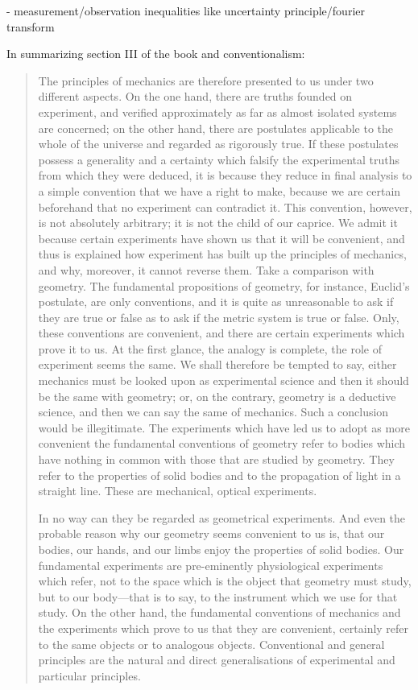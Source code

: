   - measurement/observation inequalities like uncertainty principle/fourier transform
  
  In summarizing section III of the book and conventionalism:
 
 \begin{quote}
     The principles of mechanics are therefore presented to us under two different aspects.  On the one hand, there are truths founded on experiment, and verified approximately as far as almost isolated systems are concerned; on the other hand, there are postulates applicable to the whole of the universe and regarded as rigorously true.  If these postulates possess a generality and a certainty which falsify the experimental truths from which they were deduced, it is because they reduce in final analysis to a simple convention that we have a right to make, because we are certain beforehand that no experiment can contradict it.  This convention, however, is not absolutely arbitrary; it is not the child of our caprice.  We admit it because certain experiments have shown us that it will be convenient, and thus is explained how experiment has built up the principles of mechanics, and why, moreover, it cannot reverse them.  
     Take a comparison with geometry.  The fundamental propositions of geometry, for instance, Euclid's postulate, are only conventions, and it is quite as unreasonable to ask if they are true or false as to ask if the metric system is true or false.  Only, these conventions are convenient, and there are certain experiments which prove it to us.  At the first glance, the analogy is complete, the role of experiment seems the same.  We shall therefore be tempted to say, either mechanics must be looked upon as experimental science and then it should be the same with geometry; or, on the contrary, geometry is a deductive science, and then we can say the same of mechanics.  Such a conclusion would be illegitimate.  The experiments which have led us to adopt as more convenient the fundamental conventions of geometry refer to bodies which have nothing in common with those that are studied by geometry.  They refer to the properties of solid bodies and to the propagation of light in a straight line.  These are mechanical, optical experiments.  
     
     In no way can they be regarded as geometrical experiments.  And even the probable reason why our geometry seems convenient to us is, that our bodies, our hands, and our limbs enjoy the properties of solid bodies.  Our fundamental experiments are pre-eminently physiological experiments which refer, not to the space which is the object that geometry must study, but to our body---that is to say, to the instrument which we use for that study.  On the other hand, the fundamental conventions of mechanics and the experiments which prove to us that they are convenient, certainly refer to the same objects or to analogous objects.  Conventional and general principles are the natural and direct generalisations of experimental and particular principles.  \citep[p. 135-137]{Poincare1952}
 \end{quote}
 

